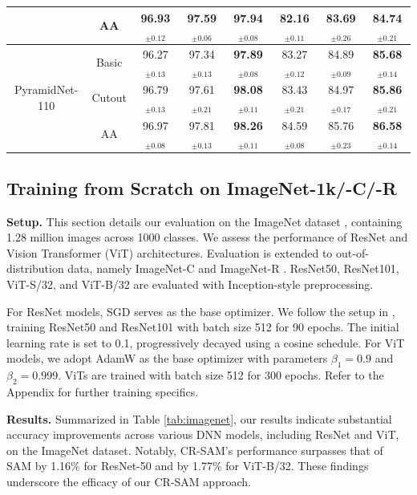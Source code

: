 \documentclass[letterpaper]{article} %
\theoremstyle{plain}
\theoremstyle{definition}
\begin{document}
\begin{table}[h]
{\begin{tabular}{c|c|ccc|ccc}
        & AA & 96.93$_{\pm 0.12}$   & 97.59$_{\pm 0.06}$ & \textbf{97.94}$_{\pm 0.08}$ & 82.16$_{\pm 0.11}$  & 83.69$_{\pm 0.26}$ & \textbf{84.74}$_{\pm 0.21}$ \\
        \midrule
        & Basic & 96.27$_{\pm 0.13}$  & 97.34$_{\pm 0.13}$ & \textbf{97.89}$_{\pm 0.08}$ & 83.27$_{\pm 0.12}$  & 84.89$_{\pm 0.09}$ & \textbf{85.68}$_{\pm 0.14}$ \\
        PyramidNet-110 & Cutout & 96.79$_{\pm 0.13}$  & 97.61$_{\pm 0.21}$ & \textbf{98.08}$_{\pm 0.11}$ & 83.43$_{\pm 0.21}$  & 84.97$_{\pm 0.17}$ & \textbf{85.86}$_{\pm 0.21}$ \\
        & AA & 96.97$_{\pm 0.08}$  & 97.81$_{\pm 0.13}$ & \textbf{98.26}$_{\pm 0.11}$ & 84.59$_{\pm 0.08}$  & 85.76$_{\pm 0.23}$ & \textbf{86.58}$_{\pm 0.14}$ \\
        \bottomrule
    \end{tabular}}
    \label{tab:cifar}
\end{table}


\subsection{Training from Scratch on ImageNet-1k/-C/-R}
\label{subsec:imagenet}

\textbf{Setup.}
This section details our evaluation on the ImageNet dataset \cite{deng2009imagenet}, containing 1.28 million images across 1000 classes. We assess the performance of ResNet \cite{he2016deep} and Vision Transformer (ViT) \cite{dosovitskiy2020image} architectures. Evaluation is extended to out-of-distribution data, namely ImageNet-C \cite{hendrycks2018benchmarking} and ImageNet-R \cite{hendrycks2021many}. ResNet50, ResNet101, ViT-S/32, and ViT-B/32 are evaluated with Inception-style preprocessing.

For ResNet models, SGD serves as the base optimizer. We follow the setup in \cite{du2022efficient}, training ResNet50 and ResNet101 with batch size 512 for 90 epochs. The initial learning rate is set to 0.1, progressively decayed using a cosine schedule. For ViT models, we adopt AdamW \cite{loshchilov2018decoupled} as the base optimizer with parameters $\beta_1=0.9$ and $\beta_2=0.999$. ViTs are trained with batch size 512 for 300 epochs. Refer to the Appendix for further training specifics.

\textbf{Results.}
Summarized in Table \ref{tab:imagenet}, our results indicate substantial accuracy improvements across various DNN models, including ResNet and ViT, on the ImageNet dataset. Notably, CR-SAM's performance surpasses that of SAM by 1.16\% for ResNet-50 and by 1.77\% for ViT-B/32. These findings underscore the efficacy of our CR-SAM approach.
\end{document}
